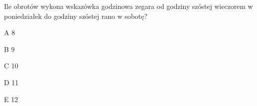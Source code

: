 \begin{tresc}
Ile obrotów wykona wskazówka godzinowa zegara od godziny szóstej wieczorem w poniedziałek do godziny szóstej rano w sobotę?
\end{tresc}
\begin{wariant}{A} 8 \end{wariant}
\begin{wariant}{B} 9 \end{wariant}
\begin{wariant}{C} 10 \end{wariant}
\begin{wariant}{D} 11 \end{wariant}
\begin{wariant}{E} 12 \end{wariant}
